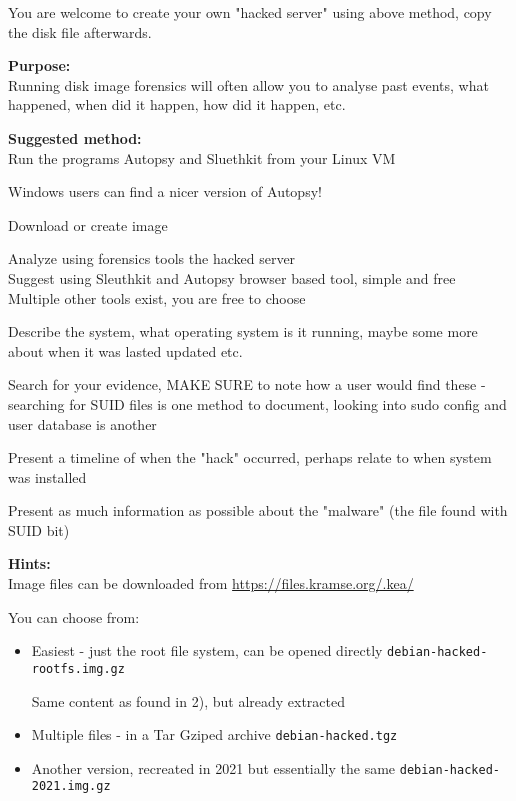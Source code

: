 \documentclass[a4paper,11pt,notitlepage]{report}
\begin{document}
You are welcome to create your own "hacked server" using above method, copy the disk file afterwards.


{\bf Purpose:}\\
Running disk image forensics will often allow you to analyse past events, what happened, when did it happen, how did it happen, etc.

{\bf Suggested method:}\\
Run the programs Autopsy and Sluethkit from your Linux VM

Windows users can find a nicer version of Autopsy!

\begin{list2}
\item Download or create image
\item Analyze using forensics tools the hacked server\\
Suggest using Sleuthkit and Autopsy browser based tool, simple and free\\
Multiple other tools exist, you are free to choose
\item Describe the system, what operating system is it running, maybe some more about when it was lasted updated etc.
\item Search for your evidence, MAKE SURE to note how a user would find these - searching for SUID files is one method to document, looking into sudo config and user database is another
\item Present a timeline of when the "hack" occurred, perhaps relate to when system was installed
\item Present as much information as possible about the "malware" (the file found with SUID bit)
\end{list2}




{\bf Hints:}\\
Image files can be downloaded from \url{https://files.kramse.org/.kea/}

You can choose from:

\begin{itemize}
\item Easiest - just the root file system, can be opened directly
 \verb+debian-hacked-rootfs.img.gz+

Same content as found in 2), but already extracted

\item Multiple files - in a Tar Gziped archive
\verb+debian-hacked.tgz+

\item Another version, recreated in 2021 but essentially the same
\verb+debian-hacked-2021.img.gz+
\end{itemize}
\end{document}
